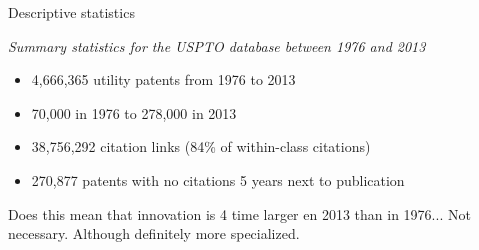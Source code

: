 \documentclass{beamer}
\begin{document}
\begin{frame}{Descriptive statistics}
    
    
    \textit{Summary statistics for the USPTO database between 1976 and 2013}
    
    \begin{itemize}
        \item 4,666,365 utility patents from 1976 to 2013
        \item 70,000 in 1976 to 278,000 in 2013
        \item 38,756,292 citation links (84\% of within-class citations)
        \item 270,877 patents with no citations 5 years next to publication
    \end{itemize}
    
    Does this mean that innovation is 4 time larger en 2013 than in 1976... \alert{Not necessary}. Although definitely more specialized.
\end{frame}
\end{document}
